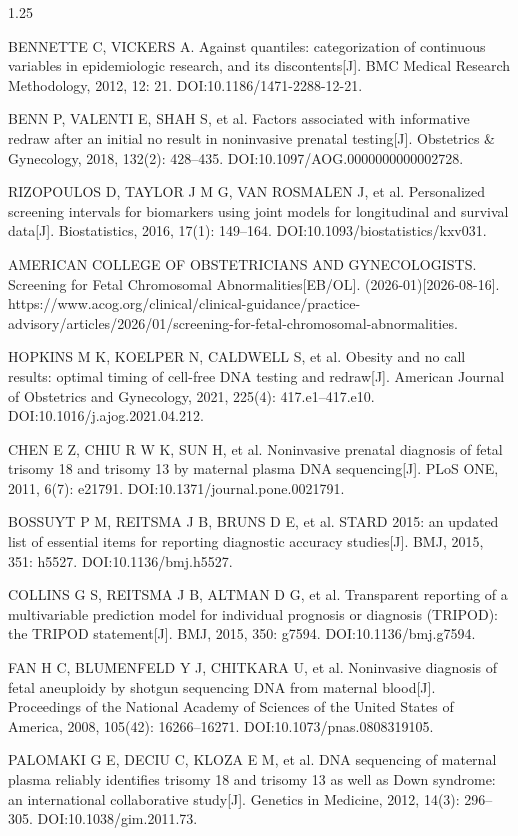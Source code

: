 \documentclass[12pt,a4paper]{ctexrep}
\numberwithin{equation}{section}
\begin{document}
\begin{spacing}{1.25}
\begin{enumerate}[label={[\arabic*]}, leftmargin=2em, labelwidth=1.5em, labelsep=0.5em, itemsep=0pt, parsep=0pt, partopsep=0pt, topsep=0pt]
		\item BENNETTE C, VICKERS A. Against quantiles: categorization of continuous variables in epidemiologic research, and its discontents[J]. BMC Medical Research Methodology, 2012, 12: 21. DOI:10.1186/1471-2288-12-21.
		\item BENN P, VALENTI E, SHAH S, et al. Factors associated with informative redraw after an initial no result in noninvasive prenatal testing[J]. Obstetrics \& Gynecology, 2018, 132(2): 428--435. DOI:10.1097/AOG.0000000000002728.
		\item RIZOPOULOS D, TAYLOR J M G, VAN ROSMALEN J, et al. Personalized screening intervals for biomarkers using joint models for longitudinal and survival data[J]. Biostatistics, 2016, 17(1): 149--164. DOI:10.1093/biostatistics/kxv031.
		\item AMERICAN COLLEGE OF OBSTETRICIANS AND GYNECOLOGISTS. Screening for Fetal Chromosomal Abnormalities[EB/OL]. (2026-01)[2026-08-16]. https://www.acog.org/clinical/clinical-guidance/practice-advisory/articles/2026/01/screening-for-fetal-chromosomal-abnormalities.
		\item HOPKINS M K, KOELPER N, CALDWELL S, et al. Obesity and no call results: optimal timing of cell-free DNA testing and redraw[J]. American Journal of Obstetrics and Gynecology, 2021, 225(4): 417.e1--417.e10. DOI:10.1016/j.ajog.2021.04.212.
		\item CHEN E Z, CHIU R W K, SUN H, et al. Noninvasive prenatal diagnosis of fetal trisomy 18 and trisomy 13 by maternal plasma DNA sequencing[J]. PLoS ONE, 2011, 6(7): e21791. DOI:10.1371/journal.pone.0021791.
		\item BOSSUYT P M, REITSMA J B, BRUNS D E, et al. STARD 2015: an updated list of essential items for reporting diagnostic accuracy studies[J]. BMJ, 2015, 351: h5527. DOI:10.1136/bmj.h5527.
		\item COLLINS G S, REITSMA J B, ALTMAN D G, et al. Transparent reporting of a multivariable prediction model for individual prognosis or diagnosis (TRIPOD): the TRIPOD statement[J]. BMJ, 2015, 350: g7594. DOI:10.1136/bmj.g7594.
		\item FAN H C, BLUMENFELD Y J, CHITKARA U, et al. Noninvasive diagnosis of fetal aneuploidy by shotgun sequencing DNA from maternal blood[J]. Proceedings of the National Academy of Sciences of the United States of America, 2008, 105(42): 16266--16271. DOI:10.1073/pnas.0808319105.
		\item PALOMAKI G E, DECIU C, KLOZA E M, et al. DNA sequencing of maternal plasma reliably identifies trisomy 18 and trisomy 13 as well as Down syndrome: an international collaborative study[J]. Genetics in Medicine, 2012, 14(3): 296--305. DOI:10.1038/gim.2011.73.

\end{enumerate}
\end{spacing}
\end{document}
